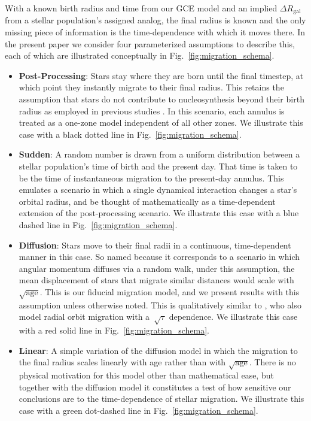 \documentclass[fleqn, usenatbib]{mnras}
\begin{document}
With a known birth radius and time from our GCE model and an implied 
$\Delta R_\text{gal}$ from a stellar population's assigned analog, the final 
radius is known and the only missing piece of information is the 
time-dependence with which it moves there. In the present paper we consider 
four parameterized assumptions to describe this, each of which are illustrated 
conceptually in Fig.~\ref{fig:migration_schema}. 
\begin{itemize} 
	\item \textbf{Post-Processing}: Stars stay where they are born until the 
	final timestep, at which point they instantly migrate to their final 
	radius. This retains the assumption that stars do not contribute to 
	nucleosynthesis beyond their birth radius as employed in previous studies 
	\citep[e.g.][]{Minchev2013}. In this scenario, each annulus is treated as 
	a one-zone model independent of all other zones. We illustrate this case 
	with a black dotted line in Fig.~\ref{fig:migration_schema}. 

	\item \textbf{Sudden}: A random number is drawn from a uniform distribution 
	between a stellar population's time of birth and the present day. That time 
	is taken to be the time of instantaneous migration to the present-day 
	annulus. This emulates a scenario in which a single dynamical interaction 
	changes a star's orbital radius, and be thought of mathematically as a 
	time-dependent extension of the post-processing scenario. We illustrate 
	this case with a blue dashed line in Fig.~\ref{fig:migration_schema}. 

	\item \textbf{Diffusion}: Stars move to their final radii in a continuous, 
	time-dependent manner in this case. So named because it corresponds to a 
	scenario in which angular momentum diffuses via a random walk, under this 
	assumption, the mean displacement of stars that migrate similar distances 
	would scale with~$\sqrt{\text{age}}$. This is our 
	fiducial migration model, and we present results with this assumption 
	unless otherwise noted. This is qualitatively similar to 
	\citet{Frankel2018, Frankel2020}, who also model radial orbit migration 
	with a~$\sqrt{\tau}$ dependence. We illustrate this case with a red solid 
	line in Fig.~\ref{fig:migration_schema}. 

	\item \textbf{Linear}: A simple variation of the diffusion model in which 
	the migration to the final radius scales linearly with age rather than with 
	$\sqrt{\text{age}}$. There is no physical motivation for this model other 
	than mathematical ease, but together with the diffusion model it 
	constitutes a test of how sensitive our conclusions are to the 
	time-dependence of stellar migration. We illustrate this case with a 
	green dot-dashed line in Fig.~\ref{fig:migration_schema}. 
\end{itemize} 
\end{document}
